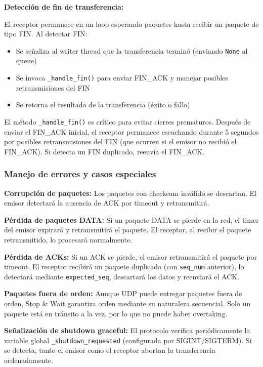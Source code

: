 \textbf{Detección de fin de transferencia:}

El receptor permanece en un loop esperando paquetes hasta recibir un paquete de tipo FIN. Al detectar FIN:
\begin{itemize}
    \item Se señaliza al writer thread que la transferencia terminó (enviando \texttt{None} al queue)
    \item Se invoca \texttt{\_handle\_fin()} para enviar FIN\_ACK y manejar posibles retransmisiones del FIN
    \item Se retorna el resultado de la transferencia (éxito o fallo)
\end{itemize}

El método \texttt{\_handle\_fin()} es crítico para evitar cierres prematuros. Después de enviar el FIN\_ACK inicial, el receptor permanece escuchando durante 5 segundos por posibles retransmisiones del FIN (que ocurren si el emisor no recibió el FIN\_ACK). Si detecta un FIN duplicado, reenvía el FIN\_ACK.

\subsubsection{Manejo de errores y casos especiales}

\textbf{Corrupción de paquetes:}
Los paquetes con checksum inválido se descartan. El emisor detectará la ausencia de ACK por timeout y retransmitirá.

\textbf{Pérdida de paquetes DATA:}
Si un paquete DATA se pierde en la red, el timer del emisor expirará y retransmitirá el paquete. El receptor, al recibir el paquete retransmitido, lo procesará normalmente.

\textbf{Pérdida de ACKs:}
Si un ACK se pierde, el emisor retransmitirá el paquete por timeout. El receptor recibirá un paquete duplicado (con \texttt{seq\_num} anterior), lo detectará mediante \texttt{expected\_seq}, descartará los datos y reenviará el ACK.

\textbf{Paquetes fuera de orden:}
Aunque UDP puede entregar paquetes fuera de orden, Stop \& Wait garantiza orden mediante su naturaleza secuencial. Solo un paquete está en tránsito a la vez, por lo que no puede haber overtaking.

\textbf{Señalización de shutdown graceful:}
El protocolo verifica periódicamente la variable global \texttt{\_shutdown\_requested} (configurada por SIGINT/SIGTERM). Si se detecta, tanto el emisor como el receptor abortan la transferencia ordenadamente.

